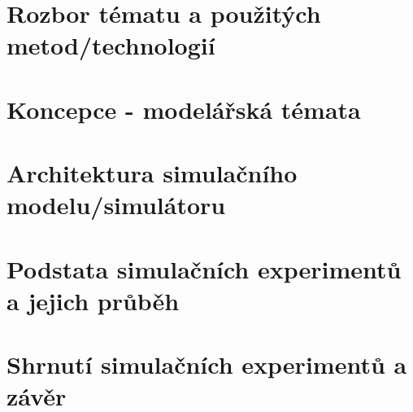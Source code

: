 \documentclass[a4paper]{article}
\begin{document}
\newpage


\section{Rozbor tématu a použitých metod/technologií}
\newpage


\section{Koncepce - modelářská témata}
\newpage


\section{Architektura simulačního modelu/simulátoru}
\newpage


\section{Podstata simulačních experimentů a jejich průběh}
\newpage


\section{Shrnutí simulačních experimentů a závěr}
\newpage
\end{document}
